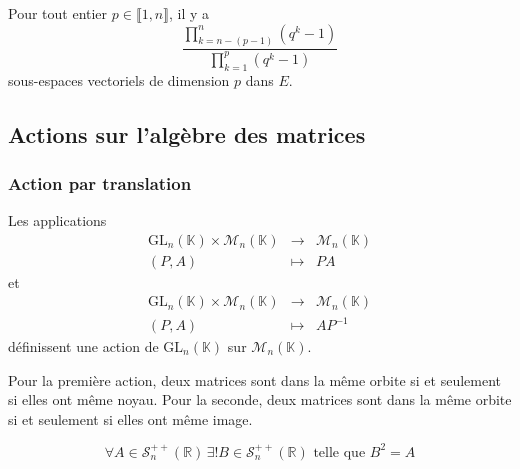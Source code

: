 
  \begin{application}
    Pour tout entier $p \in \llbracket 1, n \rrbracket$, il y a
    \[ \frac{\prod_{k=n-(p-1)}^{n} (q^k - 1)}{\prod_{k=1}^{p} (q^k - 1)} \]
    sous-espaces vectoriels de dimension $p$ dans $E$.
  \end{application}

  \subsection{Actions sur l'algèbre des matrices}

  \subsubsection{Action par translation}


  \begin{proposition}
    Les applications
    \[
    \begin{array}{ccc}
      \mathrm{GL}_n(\mathbb{K}) \times \mathcal{M}_n(\mathbb{K}) &\rightarrow& \mathcal{M}_n(\mathbb{K}) \\
      (P, A) &\mapsto& PA
    \end{array}
    \]
    et
    \[
    \begin{array}{ccc}
      \mathrm{GL}_n(\mathbb{K}) \times \mathcal{M}_n(\mathbb{K}) &\rightarrow& \mathcal{M}_n(\mathbb{K}) \\
      (P, A) &\mapsto& AP^{-1}
    \end{array}
    \]
    définissent une action de $\mathrm{GL}_n(\mathbb{K})$ sur $\mathcal{M}_n(\mathbb{K})$.
  \end{proposition}

  \begin{remark}
    Pour la première action, deux matrices sont dans la même orbite si et seulement si elles ont même noyau. Pour la seconde, deux matrices sont dans la même orbite si et seulement si elles ont même image.
  \end{remark}


  \begin{lemma}
    \[ \forall A \in \mathcal{S}_n^{++}(\mathbb{R}) \, \exists! B \in \mathcal{S}_n^{++}(\mathbb{R}) \text{ telle que } B^2 = A \]
  \end{lemma}


